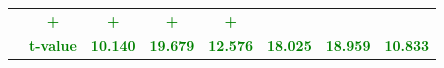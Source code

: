 \documentclass[11pt,english,a4paper,hidelinks]{book}
\begin{document}
\begin{table}[H]
\begin{tabular}{lccccccc}
                     & \textbf{\textcolor{green}{+}}
                     & \textbf{\textcolor{green}{+}}
                     & \textbf{\textcolor{green}{+}}
                     & \textbf{\textcolor{green}{+}} \\
            & \textbf{\textcolor{green}{t-value}}
                     & \textbf{\textcolor{green}{10.140}}
                     & \textbf{\textcolor{green}{19.679}}
                     & \textbf{\textcolor{green}{12.576}}
                     & \textbf{\textcolor{green}{18.025}}
                     & \textbf{\textcolor{green}{18.959}}
                     & \textbf{\textcolor{green}{10.833}} \\
        \bottomrule
    \end{tabular}
    \label{tab:europe_quality_consistency}
\end{table}
\end{document}

